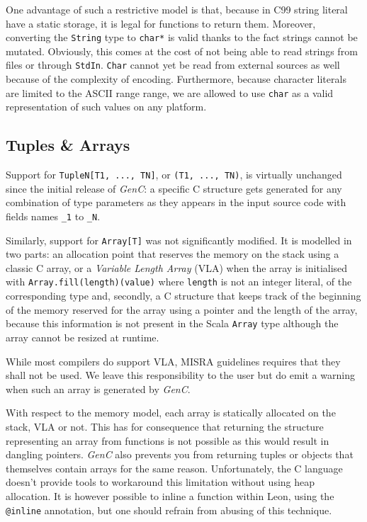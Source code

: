 \documentclass[a4paper,twoside]{article}
\newcommand{\InlineC}[1]{\lstinline[language=C99]|#1|}
\newcommand{\InlineS}[1]{\lstinline[language=Leon]|#1|}
\newcommand{\GenC}{\emph{GenC}\xspace}
\begin{document}
One advantage of such a restrictive model is that, because in C99 string literal
have a static storage, it is legal for functions to return them. Moreover,
converting the \InlineS{String} type to \InlineC{char*} is valid thanks to the
fact strings cannot be mutated. Obviously, this comes at the cost of not being
able to read strings from files or through \InlineS{StdIn}. \InlineS{Char}
cannot yet be read from external sources as well because of the complexity of
encoding. Furthermore, because character literals are limited to the ASCII range
range, we are allowed to use \InlineC{char} as a valid representation of such
values on any platform.

\subsection{Tuples \& Arrays}
\label{tuple}
\label{array}


Support for \InlineS{TupleN[T1, ..., TN]}, or \InlineS{(T1, ..., TN)}, is
virtually unchanged since the initial release of \GenC: a specific C structure
gets generated for any combination of type parameters as they appears in the
input source code with fields names \InlineS{_1} to \InlineS{_N}.

Similarly, support for \InlineS{Array[T]} was not significantly modified. It is
modelled in two parts: an allocation point that reserves the memory on the stack
using a classic C array, or a \emph{Variable Length Array} (VLA) when the array
is initialised with \InlineS{Array.fill(length)(value)} where \InlineS{length}
is not an integer literal, of the corresponding type and, secondly, a C
structure that keeps track of the beginning of the memory reserved for the array
using a pointer and the length of the array, because this information is not
present in the Scala \InlineS{Array} type although the array cannot be resized
at runtime.

While most compilers do support VLA, MISRA guidelines requires that they shall
not be used. We leave this responsibility to the user but do emit a warning when
such an array is generated by \GenC.

With respect to the memory model, each array is statically allocated on the
stack, VLA or not. This has for consequence that returning the structure
representing an array from functions is not possible as this would result in
dangling pointers. \GenC also prevents you from returning tuples or objects that
themselves contain arrays for the same reason. Unfortunately, the C language
doesn't provide tools to workaround this limitation without using heap
allocation. It is however possible to inline a function within Leon, using the
\InlineS{@inline} annotation, but one should refrain from abusing of this
technique.
\end{document}
